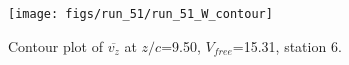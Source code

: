 \begin{figure}[H]
\centering
\texttt{[image: figs/run\_51/run\_51\_W\_contour]}
\caption{Contour plot of $\overline{v_{z}}$ at $z/c$=9.50, $V_{free}$=15.31, station 6.}
\label{fig:run_51_W_contour}
\end{figure}



